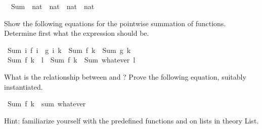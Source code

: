 \begin{isabellebody}
\isamarkuptrue%
\isanewline
\ \ Sum\ {\isacharcolon}{\isacharcolon}\ {\isachardoublequote}{\isacharparenleft}nat\ {\isacharequal}{\isachargreater}\ nat{\isacharparenright}\ {\isacharequal}{\isachargreater}\ nat\ {\isacharequal}{\isachargreater}\ nat{\isachardoublequote}\isamarkupfalse%
%
\begin{isamarkuptext}%
Show the following equations for the pointwise summation of functions.
Determine first what the expression  should be.%
\end{isamarkuptext}%
\isamarkuptrue%
\ {\isachardoublequote}Sum\ {\isacharparenleft}{\isacharpercent}i{\isachardot}\ f\ i\ {\isacharplus}\ g\ i{\isacharparenright}\ k\ {\isacharequal}\ Sum\ f\ k\ {\isacharplus}\ Sum\ g\ k{\isachardoublequote}\isamarkupfalse%
\isanewline
\isamarkupfalse%
\ {\isachardoublequote}Sum\ f\ {\isacharparenleft}k\ {\isacharplus}\ l{\isacharparenright}\ {\isacharequal}\ Sum\ f\ k\ {\isacharplus}\ Sum\ whatever\ l{\isachardoublequote}\isamarkupfalse%
\isamarkupfalse%
%
\begin{isamarkuptext}%
What is the relationship between  and ?
Prove the following equation, suitably instantiated.%
\end{isamarkuptext}%
\isamarkuptrue%
\ {\isachardoublequote}Sum\ f\ k\ {\isacharequal}\ sum\ whatever{\isachardoublequote}\isamarkupfalse%
\isamarkupfalse%
%
\begin{isamarkuptext}%
Hint: familiarize yourself with the predefined functions  and
 on lists in theory List.%
\end{isamarkuptext}%
\isamarkuptrue%
\isamarkupfalse%
\end{isabellebody}%
